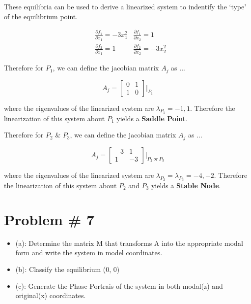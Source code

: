 \documentclass[12px]{article}
\begin{document}
    These equilibria can be used to derive a linearized system to indentify the `type' of the equilibrium point.

    $$
    \begin{matrix}
        & \frac{\partial f_{1}}{\partial x_{1}} = -3x_1^{2} & \frac{\partial f_{1}}{\partial x_{2}} = 1 \\
        & \frac{\partial f_{2}}{\partial x_{1}} = 1 & \frac{\partial f_{2}}{\partial x_{2}} = -3x_2^{2}
    \end{matrix}
    $$


    Therefore for $P_1$, we can define the jacobian matrix $A_j$ as ...

    $$ A_j =
    \begin{bmatrix}
        0 & 1 \\
        1 & 0
    \end{bmatrix}\Big|_{P_1}
    $$

    where the eigenvalues of the linearized system are $\lambda_{P_{1}} = -1, 1$. Therefore the linearization of this system about $P_1$ yields a \textbf{Saddle Point}.

    Therefore for $P_2$ \& $P_3$, we can define the jacobian matrix $A_j$ as ...

    $$ A_j =
    \begin{bmatrix}
        -3 & 1 \\
        1 & -3
    \end{bmatrix}\Big|_{P_2 \: or \: P_3}
    $$

    where the eigenvalues of the linearized system are $\lambda_{P_{2}} = \lambda_{P_{3}} = -4, -2$. Therefore the linearization of this system about $P_2$ and $P_3$ yields a \textbf{Stable Node}.


\section{Problem \# 7}

\begin{itemize}
    \item (a): Determine the matrix M that transforms A into the appropriate modal form and write the system in model coordinates.
    \item (b): Classify the equilibrium (0, 0)
    \item (c): Generate the Phase Portrais of the system in both modal(z) and original(x) coordinates.

\end{itemize}
\end{document}
